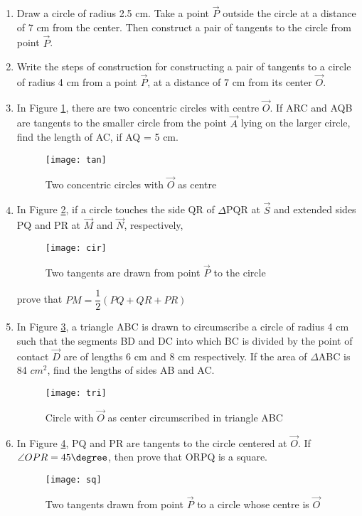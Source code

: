 \begin{enumerate}

	\item Draw a circle of radius 2.5 cm. Take a point $\vec{P}$ outside the circle at a distance of 7 cm from the center. Then construct a pair of tangents to the circle from point $\vec{P}$.

	\item Write the steps of construction for constructing a pair of tangents to a circle of radius 4 cm from a point $\vec{P}$, at a distance of 7 cm from its center $\vec{O}$.

	\item In Figure \ref{fig:tan1}, there are two concentric circles with centre $\vec{O}$. If ARC and AQB are tangents to the smaller circle  from the point $\vec{A}$ lying on the larger circle, find the length of AC, if AQ = 5 cm.
		\begin{figure}[H]
			\centering
			\texttt{[image: tan]}
			\caption{Two concentric circles with $\vec{O}$ as centre}
			\label{fig:tan1}
		\end{figure}
	
	\item In Figure \ref{fig:cir1}, if a circle touches the side QR of $\Delta$PQR at $\vec{S}$ and extended sides PQ and PR at $\vec{M}$ and $\vec{N}$, respectively,
		\begin{figure}[H]
			\centering
			\texttt{[image: cir]}
				\caption{Two tangents are drawn from point $\vec{P}$ to the circle}
				\label{fig:cir1}
		\end{figure}
		prove that $PM=\dfrac{1}{2}(PQ+QR+PR)$

	\item In Figure \ref{fig:tri1}, a triangle ABC is drawn to circumscribe a circle of radius 4 cm such that the segments BD and DC into which BC is divided by the point of contact $\vec{D}$ are of lengths 6 cm and 8 cm respectively. If the area of $\Delta$ABC is 84 $cm^2$, find the lengths of sides AB and AC.
		\begin{figure}[H]
			\centering
			\texttt{[image: tri]}
				\caption{Circle with $\vec{O}$ as center circumscribed in triangle ABC}
				\label{fig:tri1}
		\end{figure}

	\item In Figure \ref{fig:sq1}, PQ and PR are tangents to the circle centered at $\vec{O}$. If $\angle OPR=45\degree$, then prove that ORPQ is a square.
		\begin{figure}[H]
			\centering
			\texttt{[image: sq]}
			\caption{Two tangents drawn from point $\vec{P}$ to a circle whose centre is $\vec{O}$}
			\label{fig:sq1}
		\end{figure}


\end{enumerate}
